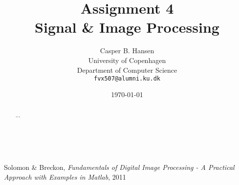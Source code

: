 \documentclass[11pt]{article}
\title
{
    {\Large Assignment 4} \\
    Signal \& Image Processing
}
\author
{
    Casper B. Hansen\\
    University of Copenhagen\\
    Department of Computer Science\\
    {\tt fvx507@alumni.ku.dk}
}
\date{\today}
\begin{document}
\maketitle
\thispagestyle{empty}
\begin{multicols}{2}
    \begin{abstract}
        ...
    \end{abstract}
    \vfill{\ }\columnbreak
    \tableofcontents
\end{multicols}
\clearpage




\appendix


\begin{thebibliography}{9}

    Solomon \& Breckon,
    \emph{Fundamentals of Digital Image Processing - A Practical Approach with
    Examples in Matlab},
    2011

\end{thebibliography}
\end{document}
